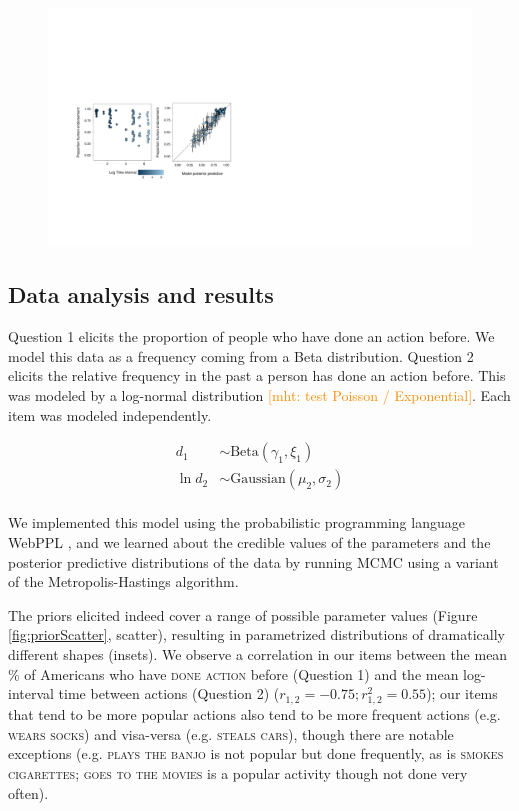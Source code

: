 \documentclass[10pt,letterpaper]{article}
\newcommand{\mht}[1]{\textcolor{DarkOrange}{[mht: #1]}}
\begin{document}
\begin{figure}[t]
\centering
  \includegraphics[width=\textwidth]{tj-scatters1}
  \caption{}
  \label{fig:tjScatters}
\end{figure}


\subsection{Data analysis and results}

Question 1 elicits the proportion of people who have done an action before. 
We model this data as a frequency coming from a Beta distribution. 
Question 2 elicits the relative frequency in the past a person has done an action before.
This was modeled by a log-normal distribution \mht{test Poisson / Exponential}. 
Each item was modeled independently.
%
\begin{minipage}{0.5 \textwidth} \small
\begin{align*}
d_{1} &\sim \text{Beta}(\gamma_{1}, \xi_{1}) \\
\ln d_{2} &\sim \text{Gaussian}(\mu_{2}, \sigma_{2}) \\
\end{align*}
\end{minipage}
%
We implemented this model using the probabilistic programming language WebPPL \cite{dippl}, and we learned about the credible values of the parameters and the posterior predictive distributions of the data by running MCMC using a variant of the Metropolis-Hastings algorithm.
%


The priors elicited indeed cover a range of possible parameter values (Figure \ref{fig:priorScatter}, scatter), resulting in parametrized distributions of dramatically different shapes (insets).  
We observe a correlation in our items between the mean \% of Americans who have \textsc{done action} before (Question 1) and the mean log-interval time between actions (Question 2) ($r_{1,2} = -0.75; r^2_{1,2} = 0.55$); our items that tend to be more popular actions also tend to be more frequent actions (e.g. \textsc{wears socks}) and visa-versa (e.g. \textsc{steals cars}), though there are notable exceptions (e.g. \textsc{plays the banjo} is not popular but done frequently, as is \textsc{smokes cigarettes}; \textsc{goes to the movies} is a popular activity though not done very often). 
\end{document}
